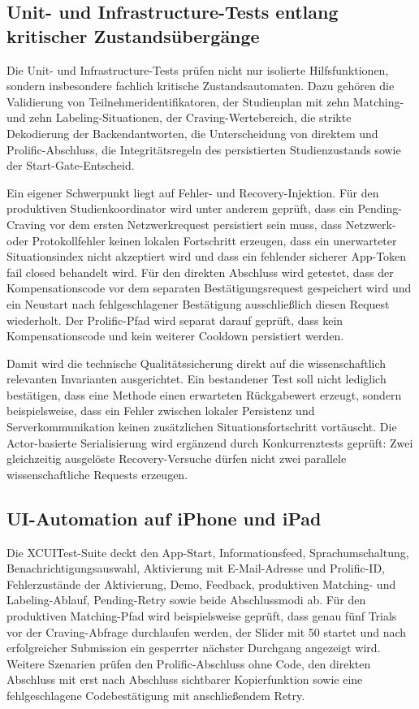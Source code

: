 \begin{neu}
\subsection{Unit- und Infrastructure-Tests entlang kritischer Zustandsübergänge}

Die Unit- und Infrastructure-Tests prüfen nicht nur isolierte Hilfsfunktionen, sondern insbesondere fachlich kritische Zustandsautomaten. Dazu gehören die Validierung von Teilnehmeridentifikatoren, der Studienplan mit zehn Matching- und zehn Labeling-Situationen, der Craving-Wertebereich, die strikte Dekodierung der Backendantworten, die Unterscheidung von direktem und Prolific-Abschluss, die Integritätsregeln des persistierten Studienzustands sowie der Start-Gate-Entscheid.

Ein eigener Schwerpunkt liegt auf Fehler- und Recovery-Injektion. Für den produktiven Studienkoordinator wird unter anderem geprüft, dass ein Pending-Craving vor dem ersten Netzwerkrequest persistiert sein muss, dass Netzwerk- oder Protokollfehler keinen lokalen Fortschritt erzeugen, dass ein unerwarteter Situationsindex nicht akzeptiert wird und dass ein fehlender sicherer App-Token fail closed behandelt wird. Für den direkten Abschluss wird getestet, dass der Kompensationscode vor dem separaten Bestätigungsrequest gespeichert wird und ein Neustart nach fehlgeschlagener Bestätigung ausschließlich diesen Request wiederholt. Der Prolific-Pfad wird separat darauf geprüft, dass kein Kompensationscode und kein weiterer Cooldown persistiert werden.

Damit wird die technische Qualitätssicherung direkt auf die wissenschaftlich relevanten Invarianten ausgerichtet. Ein bestandener Test soll nicht lediglich bestätigen, dass eine Methode einen erwarteten Rückgabewert erzeugt, sondern beispielsweise, dass ein Fehler zwischen lokaler Persistenz und Serverkommunikation keinen zusätzlichen Situationsfortschritt vortäuscht. Die Actor-basierte Serialisierung wird ergänzend durch Konkurrenztests geprüft: Zwei gleichzeitig ausgelöste Recovery-Versuche dürfen nicht zwei parallele wissenschaftliche Requests erzeugen.

\subsection{UI-Automation auf iPhone und iPad}

Die XCUITest-Suite deckt den App-Start, Informationsfeed, Sprachumschaltung, Benachrichtigungsauswahl, Aktivierung mit E-Mail-Adresse und Prolific-ID, Fehlerzustände der Aktivierung, Demo, Feedback, produktiven Matching- und Labeling-Ablauf, Pending-Retry sowie beide Abschlussmodi ab. Für den produktiven Matching-Pfad wird beispielsweise geprüft, dass genau fünf Trials vor der Craving-Abfrage durchlaufen werden, der Slider mit 50 startet und nach erfolgreicher Submission ein gesperrter nächster Durchgang angezeigt wird. Weitere Szenarien prüfen den Prolific-Abschluss ohne Code, den direkten Abschluss mit erst nach Abschluss sichtbarer Kopierfunktion sowie eine fehlgeschlagene Codebestätigung mit anschließendem Retry.


\end{neu}
